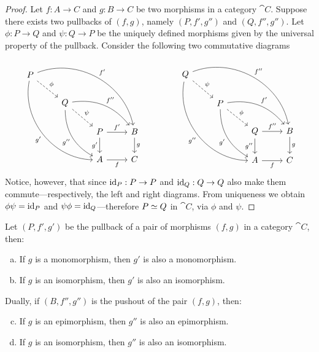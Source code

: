 \begin{proof}
    Let \(f: A \to C\) and \(g: B \to C\) be two morphisms in a category \(\cat
    C\). Suppose there exists two pullbacks of \((f, g)\), namely \((P, f', g'')\)
    and \((Q, f'', g'')\). Let \(\phi: P \to Q\) and \(\psi: Q \to P\) be the
    uniquely defined morphisms given by the universal property of the
    pullback. Consider the following two commutative diagrams
    \[
        \begin{tikzcd}
            P \ar[rd, dashed, "\phi"]
            \ar[rrrdd, bend left=50, "f'"]
            \ar[ddrrd, bend right=50, "g'"']
            & & &
            \\
            &Q \ar[dr, dashed, "\psi"]
            \ar[rrd, bend left, "f''"]
            \ar[drd, bend right, "g''"']
            & &
            \\
            & &P \ar[r, "f'"] \ar[d, "g'"']
            &B \ar[d, "g"]
            \\
            & &A \ar[r, "f"'] &C
        \end{tikzcd}
        \qquad \qquad
        \begin{tikzcd}
            Q \ar[rd, dashed, "\psi"]
            \ar[rrrdd, bend left=50, "f''"]
            \ar[ddrrd, bend right=50, "g''"']
            & & &
            \\
            &P \ar[dr, dashed, "\phi"]
            \ar[rrd, bend left, "f'"]
            \ar[drd, bend right, "g'"']
            & &
            \\
            & &Q \ar[r, "f''"] \ar[d, "g''"']
            &B \ar[d, "g"]
            \\
            & &A \ar[r, "f"'] &C
        \end{tikzcd}
    \]
    Notice, however, that since \(\operatorname{id}_P: P \to P\) and \(\operatorname{id}_Q: Q \to Q\) also make
    them commute---respectively, the left and right diagrams. From uniqueness we
    obtain \(\phi \psi = \operatorname{id}_P\) and \(\psi \phi = \operatorname{id}_Q\)---therefore \(P \simeq
    Q\) in \(\cat C\), via \(\phi\) and \(\psi\).
\end{proof}

\begin{proposition}
    \label{prop:preservation-monic-epic-iso-by-pull-push}
    Let \((P, f', g')\) be the pullback of a pair of morphisms \((f, g)\) in a
    category \(\cat C\), then:
    \begin{enumerate}[(a)]\setlength\itemsep{0em}
        \item If \(g\) is a monomorphism, then \(g'\) is also a monomorphism.
        \item If \(g\) is an isomorphism, then \(g'\) is also an isomorphism.
    \end{enumerate}
    Dually, if \((B, f'', g'')\) is the pushout of the pair \((f, g)\), then:
    \begin{enumerate}[(a)]\setcounter{enumi}{2}\setlength\itemsep{0em}
        \item If \(g\) is an epimorphism, then \(g''\) is also an epimorphism.
        \item If \(g\) is an isomorphism, then \(g''\) is also an isomorphism.
    \end{enumerate}
\end{proposition}

